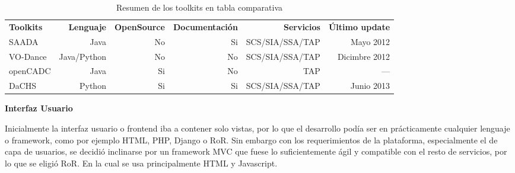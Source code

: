 \begin{table}[h!t]
\centering
\caption{Resumen de los toolkits en tabla comparativa}
\begin{tabular}{lrrrrr}
    {\bf Toolkits} & {\bf Lenguaje} & {\bf OpenSource} & {\bf Documentación} & {\bf Servicios} & {\bf Último update}  \\
    SAADA          & Java           & No               & Si                  & SCS/SIA/SSA/TAP & Mayo 2012     \\
    VO-Dance       & Java/Python    & No               & No                  & SCS/SIA/SSA/TAP & Dicimbre 2012 \\
    openCADC       & Java           & Si               & No                  & TAP             & ---           \\
    DaCHS          & Python         & Si               & Si                  & SCS/SIA/SSA/TAP & Junio 2013    \\
\end{tabular}
\label{table:toolkits}
\end{table}

\textbf{Interfaz Usuario}

Inicialmente la interfaz usuario o frontend iba a contener solo vistas, por lo que
el desarrollo podía ser en prácticamente cualquier lenguaje o framework, como por
ejemplo HTML, PHP, Django o RoR. Sin embargo con los requerimientos de la
plataforma, especialmente el de capa de usuarios, se decidió inclinarse por un
framework MVC que fuese lo suficientemente ágil y compatible con el resto de
servicios, por lo que se eligió RoR. En la cual se usa principalmente HTML y
Javascript.
